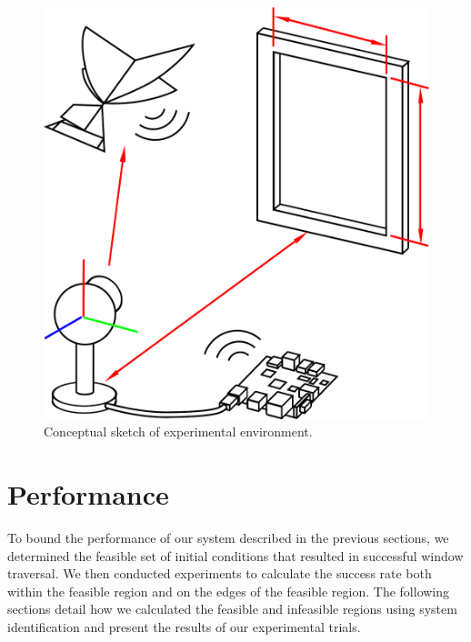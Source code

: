 \documentclass{aamas2013}
\begin{document}
\begin{figure}[tb]
\centering
\includegraphics[width=\linewidth]{figures/experiment_cartoon.pdf}
\caption{Conceptual sketch of experimental environment.}
\label{fig:experiment_cartoon}
\end{figure}


\section{Performance}
To bound the performance of our system described in the previous sections, we
determined the feasible set of initial conditions that resulted in successful
window traversal. We then conducted experiments to calculate the success rate
both within the feasible region and on the edges of the feasible region. The
following sections detail how we calculated the feasible and infeasible
regions using system identification and present the results of our
experimental trials.

\end{document}
